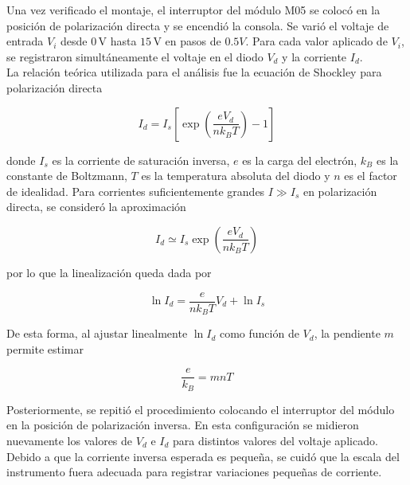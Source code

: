 Una vez verificado el montaje, el interruptor del módulo M05 se colocó en la posición de polarización directa y se encendió la consola. Se varió el voltaje de entrada \(V_i\) desde \(0\,\mathrm{V}\) hasta \(15\,\mathrm{V}\) en pasos de $0.5V$. Para cada valor aplicado de \(V_i\), se registraron simultáneamente el voltaje en el diodo \(V_d\) y la corriente \(I_d\).\\

La relación teórica utilizada para el análisis fue la ecuación de Shockley para polarización directa

\begin{equation}
    I_d = I_s \left[
    \exp\left(
    \frac{e V_d}{n k_B T}
    \right) - 1
    \right]
\end{equation}

donde \(I_s\) es la corriente de saturación inversa, \(e\) es la carga del electrón, \(k_B\) es la constante de Boltzmann, \(T\) es la temperatura absoluta del diodo y \(n\) es el factor de idealidad. Para corrientes suficientemente grandes $I \gg I_s$ en polarización directa, se consideró la aproximación

\begin{equation}
    I_d \simeq I_s
    \exp\left(
    \frac{e V_d}{n k_B T}
    \right)
\end{equation}

por lo que la linealización queda dada por

\begin{equation}
    \label{eqlineal}
    \ln I_d =
    \frac{e}{n k_B T} V_d + \ln I_s
\end{equation}

De esta forma, al ajustar linealmente \(\ln I_d\) como función de \(V_d\), la pendiente \(m\) permite estimar

\begin{equation}
    \frac{e}{k_B} = m n T
\end{equation}

Posteriormente, se repitió el procedimiento colocando el interruptor del módulo en la posición de polarización inversa. En esta configuración se midieron nuevamente los valores de \(V_d\) e \(I_d\) para distintos valores del voltaje aplicado. Debido a que la corriente inversa esperada es pequeña, se cuidó que la escala del instrumento fuera adecuada para registrar variaciones pequeñas de corriente.\\


